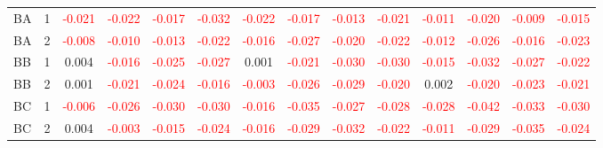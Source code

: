 \begin{table}[!htb]
{\begin{tabular}{llcccccccccccc}
BA & 1 & \textcolor{red}{-0.021} & \textcolor{red}{-0.022} & \textcolor{red}{-0.017} & \textcolor{red}{-0.032} & \textcolor{red}{-0.022} & \textcolor{red}{-0.017} & \textcolor{red}{-0.013} & \textcolor{red}{-0.021} & \textcolor{red}{-0.011} & \textcolor{red}{-0.020} & \textcolor{red}{-0.009} & \textcolor{red}{-0.015}\\
BA & 2 & \textcolor{red}{-0.008} & \textcolor{red}{-0.010} & \textcolor{red}{-0.013} & \textcolor{red}{-0.022} & \textcolor{red}{-0.016} & \textcolor{red}{-0.027} & \textcolor{red}{-0.020} & \textcolor{red}{-0.022} & \textcolor{red}{-0.012} & \textcolor{red}{-0.026} & \textcolor{red}{-0.016} & \textcolor{red}{-0.023}\\
BB & 1 & 0.004 & \textcolor{red}{-0.016} & \textcolor{red}{-0.025} & \textcolor{red}{-0.027} & 0.001 & \textcolor{red}{-0.021} & \textcolor{red}{-0.030} & \textcolor{red}{-0.030} & \textcolor{red}{-0.015} & \textcolor{red}{-0.032} & \textcolor{red}{-0.027} & \textcolor{red}{-0.022}\\
BB & 2 & 0.001 & \textcolor{red}{-0.021} & \textcolor{red}{-0.024} & \textcolor{red}{-0.016} & \textcolor{red}{-0.003} & \textcolor{red}{-0.026} & \textcolor{red}{-0.029} & \textcolor{red}{-0.020} & 0.002 & \textcolor{red}{-0.020} & \textcolor{red}{-0.023} & \textcolor{red}{-0.021}\\
BC & 1 & \textcolor{red}{-0.006} & \textcolor{red}{-0.026} & \textcolor{red}{-0.030} & \textcolor{red}{-0.030} & \textcolor{red}{-0.016} & \textcolor{red}{-0.035} & \textcolor{red}{-0.027} & \textcolor{red}{-0.028} & \textcolor{red}{-0.028} & \textcolor{red}{-0.042} & \textcolor{red}{-0.033} & \textcolor{red}{-0.030}\\
BC & 2 & 0.004 & \textcolor{red}{-0.003} & \textcolor{red}{-0.015} & \textcolor{red}{-0.024} & \textcolor{red}{-0.016} & \textcolor{red}{-0.029} & \textcolor{red}{-0.032} & \textcolor{red}{-0.022} & \textcolor{red}{-0.011} & \textcolor{red}{-0.029} & \textcolor{red}{-0.035} & \textcolor{red}{-0.024}\\
\hline
    \end{tabular}%
    }
\end{table}

